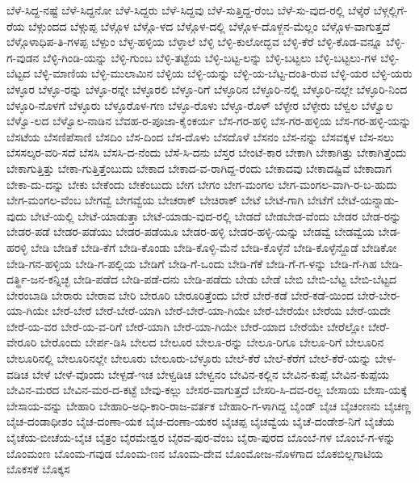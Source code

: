 ಬೆಳೆ-ಸಿದ್ದ-ನಷ್ಟೆ
ಬೆಳೆ-ಸಿದ್ದನೋ
ಬೆಳೆ-ಸಿದ್ದರು
ಬೆಳೆ-ಸಿದ್ದವು
ಬೆಳೆ-ಸುತ್ತಿದ್ದ-ರೆಂಬ
ಬೆಳೆ-ಸು-ವುದ-ರಲ್ಲಿ
ಬೆಳ್ಕೆರೆ
ಬೆಳ್ಗಲ್ಲಿಗೆ-ರೆಯ
ಬೆಳ್ಗುಂದದ
ಬೆಳ್ಗುಪ್ಪ
ಬೆಳ್ಗೊಳ
ಬೆಳ್ಗೊ-ಳದ
ಬೆಳ್ಗೊಳ-ದಲ್ಲಿ
ಬೆಳ್ಗೊಳ-ದೊಳ್ಜನ-ಮೆಲ್ಲಂ
ಬೆಳ್ಗೊಳ-ವಾಗುತ್ತದೆ
ಬೆಳ್ಗೊಳಾಧಿಪ-ತಿ-ಗಳಪ್ಪ
ಬೆಳ್ಪುಂ
ಬೆಳ್ಳ-ಹಳ್ಳಿಯ
ಬೆಳ್ಳಾಲೆ
ಬೆಳ್ಳಿ
ಬೆಳ್ಳಿ-ಕುಲೋದ್ಭವ
ಬೆಳ್ಳಿ-ಕೆರೆ
ಬೆಳ್ಳಿ-ಕೊಡ-ವನ್ನೂ
ಬೆಳ್ಳಿ-ಗ-ವುಡನ
ಬೆಳ್ಳಿ-ಗಿಂಡಿ-ಯನ್ನು
ಬೆಳ್ಳಿ-ಗುಂಬ
ಬೆಳ್ಳಿ-ತಟ್ಟೆಯ
ಬೆಳ್ಳಿ-ಬಟ್ಟ-ಲನ್ನು
ಬೆಳ್ಳಿ-ಬಟ್ಟಲು
ಬೆಳ್ಳಿ-ಬಟ್ಟಲು-ಗಳ
ಬೆಳ್ಳಿ-ಬೆಟ್ಟದ
ಬೆಳ್ಳಿ-ಮಾಣಿಯ
ಬೆಳ್ಳಿ-ಮುಲಾಮಿನ
ಬೆಳ್ಳಿಯ
ಬೆಳ್ಳಿ-ಯನ್ನು
ಬೆಳ್ಳಿ-ಯ-ಬೆಟ್ಟ-ದಂತಿ-ರುವ
ಬೆಳ್ಳಿ-ಯರ
ಬೆಳ್ಳಿ-ಯರು
ಬೆಳ್ಳೂರ
ಬೆಳ್ಳೂ-ರನ್ನು
ಬೆಳ್ಳೂ-ರನ್ನೇ
ಬೆಳ್ಳೂರಲಿ
ಬೆಳ್ಳೂ-ರಿಗೆ
ಬೆಳ್ಳೂರಿನ
ಬೆಳ್ಳೂರಿ-ನಲ್ಲಿ
ಬೆಳ್ಳೂರಿ-ನಲ್ಲೇ
ಬೆಳ್ಳೂರಿ-ನಿಂದ
ಬೆಳ್ಳೂರಿ-ನೊಳಗೆ
ಬೆಳ್ಳೂರು
ಬೆಳ್ಳೂರೊಳ-ಗಣ
ಬೆಳ್ಳೂ-ರೊಳು
ಬೆಳ್ಳೂ-ರೊಳ್
ಬೆಳ್ಳೇರ
ಬೆಳ್ಳೇರು
ಬೆಳ್ವಲ
ಬೆಳ್ವೊಲ
ಬೆಳ್ವೊ-ಲದ
ಬೆಳ್ವೊಲ-ನಾಡಿನ
ಬೆವಹ-ರ-ಪೂಜಾ-ಕೈಂಕರ್ಯ
ಬೆಸ-ಗರ-ಹಳ್ಳಿ
ಬೆಸ-ಗರ-ಹಳ್ಳಿಯ
ಬೆಸ-ಗರ-ಹಳ್ಳಿ-ಯನ್ನು
ಬೆಸಟೆಯ
ಬೆಸಣಿಪೆಸಾಣಿ
ಬೆಸದಿಂ
ಬೆಸ-ದಿಂದ
ಬೆಸ-ದೊಳು
ಬೆಸದೊಳೆ
ಬೆಸನಂ
ಬೆಸ-ನನ್ನು
ಬೆಸವಕ್ಕಳ
ಬೆಸ-ಸಲು
ಬೆಸಸಲ್ಕರ-ವರಿ-ಸದೆ
ಬೆಸಸಿ
ಬೆಸಸಿ-ದ-ನೆಂದು
ಬೆಸೆ-ಸಿ-ದನು
ಬೆಸ್ತರ
ಬೇಂಟೆ-ಕಾರ
ಬೇಕಾಗಿ
ಬೇಕಾಗಿತ್ತು
ಬೇಕಾಗಿತ್ತೆಂದು
ಬೇಕಾಗುತ್ತಿತ್ತು
ಬೇಕಾ-ಗುತ್ತಿತ್ತೆಂಬುದು
ಬೇಕಾದ
ಬೇಕಾದ-ವ-ರಾಗಿದ್ದ-ರೆಂದು
ಬೇಕಾದವು
ಬೇಕಾದಷ್ಟಿವೆ
ಬೇಕಾದಾಗ
ಬೇಕಾ-ದು-ದನ್ನು
ಬೇಕು
ಬೇಕೆಂದು
ಬೇಕೆಂಬುದು
ಬೇಗ
ಬೇಗಂ
ಬೇಗ-ಮಂಗಲ
ಬೇಗ-ಮಂಗಲ-ವಾಗಿ-ರ-ಬ-ಹುದು
ಬೇಗ-ಮಂಗಲ-ವೆಂಬ
ಬೇಗವ್ವೆ
ಬೇಗವ್ವೆಯ
ಬೇಚರಾಕ್
ಬೇಚಿರಾಕ್
ಬೇಟೆ
ಬೇಟೆ-ಗಾಗಿ
ಬೇಟೆಗೆ
ಬೇಟೆ-ಯನ್ನಾಡು-ವುದು
ಬೇಟೆ-ಯಲ್ಲಿ
ಬೇಟೆ-ಯಾಡುತ್ತಾ
ಬೇಟೆ-ಯಾಡು-ವುದ-ರಲ್ಲಿ
ಬೇಡದೆ
ಬೇಡಬೇಡ-ವೆಂದು
ಬೇಡರ
ಬೇಡ-ರನ್ನು
ಬೇಡರ-ಪಡೆ
ಬೇಡರ-ಪಡೆಯು
ಬೇಡರ-ಪಡೆಯೂ
ಬೇಡರ-ಹಳ್ಳಿ
ಬೇಡರ-ಹಳ್ಳಿ-ಯನ್ನು
ಬೇಡವ್ವೆ
ಬೇಡವ್ವೆಯ
ಬೇಡ-ಹರಳ್ಳಿ
ಬೇಡಿ
ಬೇಡಿಕೆ
ಬೇಡಿ-ಕೆಗೆ
ಬೇಡಿ-ಕೊಂಡು
ಬೇಡಿ-ಕೊಳ್ಳಿ-ಮೆನೆ
ಬೇಡಿ-ಕೊಳ್ಳೆನೆ
ಬೇಡಿ-ಕೊಳ್ಳೆನ್ದೊಡೆ
ಬೇಡಿಕೋ
ಬೇಡಿ-ಗನ-ಹಳ್ಳಿಯ
ಬೇಡಿ-ಗ-ಪಲ್ಲಿಯ
ಬೇಡಿಗೆ
ಬೇಡಿ-ಗೆ-ಒಂದು
ಬೇಡಿ-ಗೆಕೆ
ಬೇಡಿ-ಗೆ-ಗ-ಳನ್ನು
ಬೇಡಿ-ಗೆ-ಗಿಹ
ಬೇಡಿ-ದರ್ತ್ಥಿ-ಜನ-ಕನ್ನಿಚ್ಛ
ಬೇಡಿ-ಪಡೆದ
ಬೇಡಿ-ಪಡೆ-ದನು
ಬೇಡಿ-ಪಡೆದು
ಬೇಡು
ಬೇಡೆ
ಬೇಬಿ
ಬೇಬಿ-ಬೆಟ್ಟ
ಬೇಬಿ-ಬೆಟ್ಟದ
ಬೇರಂಬಾಡಿ
ಬೇರಾರು
ಬೇರಾವ
ಬೇರಿ
ಬೇರೂರಿ
ಬೇರೂರಿತ್ತೆಂದು
ಬೇರೆ
ಬೇರೆ-ಕಡೆ
ಬೇರೆ-ಕಡೆ-ಯಿಂದ
ಬೇರೆ-ಬೇರ-ಯಾ-ಗಿಯೇ
ಬೇರೆ-ಬೇರೆ
ಬೇರೆ-ಬೇರೆ-ಯಾಗಿ
ಬೇರೆ-ಬೇರೆ-ಯಾ-ಗಿಯೇ
ಬೇರೆ-ಬೇರೆಯೇ
ಬೇರೆಯ
ಬೇರೆ-ಯದೇ
ಬೇರೆ-ಯ-ವರ
ಬೇರೆ-ಯ-ವ-ರಿಗೆ
ಬೇರೆ-ಯಾಗಿ
ಬೇರೆ-ಯಾ-ಗಿಯೇ
ಬೇರೆ-ಯಾದ
ಬೇರೆಯೇ
ಬೇರೆಲ್ಲೋ
ಬೇರೆ-ವೇರೂರಿ
ಬೇರೊಂದು
ಬೇರ್ಪ-ಡಿಸಿ
ಬೇಲದ
ಬೇಲೂರ
ಬೇಲೂ-ರನ್ನು
ಬೇಲೂ-ರಿಗೂ
ಬೇಲೂ-ರಿಗೆ
ಬೇಲೂರಿನ
ಬೇಲೂರಿನಲ್ಲಿ
ಬೇಲೂರಿನಲ್ಲೇ
ಬೇಲೂರು
ಬೇಲೂರು-ಬೆಳ್ಳೂರು
ಬೇಲೆ-ಕೆರೆ
ಬೇಲೆ-ಕೆರೆಗೆ
ಬೇಲೆ-ಕೆರೆ-ಯನ್ನು
ಬೇಳ-ವಡಿಚ
ಬೇಳೆ
ಬೇಳೆ-ವೊಂದು
ಬೇಳ್ಪಡೆ-ಇಚ
ಬೇಳ್ವಡಿಚ
ಬೇಳ್ವನಂ
ಬೇವಿನ-ಕಲ್ಲಿನ
ಬೇವಿನ-ಕುಪ್ಪೆ
ಬೇವಿನ-ಕುಪ್ಪೆಯ
ಬೇವಿನ-ಮರದ
ಬೇವಿನ-ಮರ-ದ-ಕಟ್ಟೆ
ಬೇವು-ಕಲ್ಲು
ಬೇಸರ-ವಾಗುತ್ತದೆ
ಬೇಸರಿ-ಸಿ-ದವ-ರಲ್ಲ
ಬೇಸಾಯ
ಬೇಸಾ-ಯಕ್ಕೆ
ಬೇಸಾಯ-ವನ್ನು
ಬೇಹಾರಿ
ಬೇಹಾರಿ-ಅಧಿ-ಕಾರಿ-ರಾಜ-ವರ್ತಕ
ಬೇಹಾರಿ-ಗ-ಳಾಗಿದ್ದ
ಬೈಂಡ್
ಬೈಚ
ಬೈಚಂಣನು
ಬೈಚಣ್ಣ
ಬೈಚ-ದಂಡಾಧೀಶಂ
ಬೈಚ-ದಂಣಾ-ಯಕ
ಬೈಚ-ದಂಣಾ-ಯಕರ
ಬೈಚಪ್ಪ
ಬೈಚವ್ವೆಯ
ಬೈಚೆ-ದಂಡೇಶ-ನಿಗೆ
ಬೈಚೆಯ
ಬೈಚೆಯ-ಬೀಚೆಯ-ಬೈಚ
ಬೈತ್ರಂ
ಬೈರಮೇಶ್ವರ
ಬೈರವ-ಪುರ-ವೆಂಬ
ಬೈರಾ-ಪುರದ
ಬೊಂಬೆ-ಗಳ
ಬೊಂಬೆ-ಗ-ಳನ್ನು
ಬೊಂಮಂಣ
ಬೊಂಮ-ಗವುಡ
ಬೊಂಮ-ಣನ
ಬೊಂಮ-ದೇವ
ಬೊಂಮೋಜ-ನೊಳಗಾದ
ಬೊಕಬಿಲ್ಲಗಾಟಿಯ
ಬೊಕಸಕೆ
ಬೊಕ್ಕಸ
